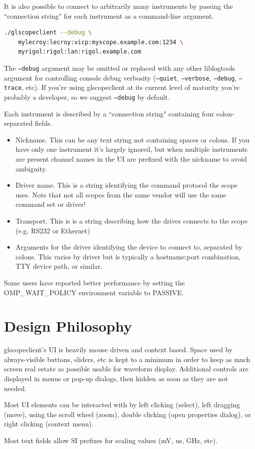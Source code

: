 It is also possible to connect to arbitrarily many instruments by passing the ``connection string" for each instrument
as a command-line argument.

\begin{lstlisting}[language=sh]
./glscopeclient --debug \
	mylecroy:lecroy:vicp:myscope.example.com:1234 \
	myrigol:rigol:lan:rigol.example.com
\end{lstlisting}

The \texttt{--debug} argument may be omitted or replaced with any other liblogtools argument for controlling console
debug verbosity (\texttt{--quiet}, \texttt{--verbose}, \texttt{--debug}, \texttt{--trace}, etc). If you're using
glscopeclient at its current level of maturity you're probably a developer, so we suggest \texttt{--debug} by default.

Each instrument is described by a ``connection string" containing four colon-separated fields.

\begin{itemize}
\item Nickname. This can be any text string not containing spaces or colons. If you have only one instrument it's
largely ignored, but when multiple instruments are present channel names in the UI are prefixed with the nickname to
avoid ambiguity.
\item Driver name. This is a string identifying the command protocol the scope uses. Note that not all
scopes from the same vendor will use the same command set or driver!
\item Transport. This is is a string describing how the driver connects to the scope (e.g. RS232 or Ethernet)
\item Arguments for the driver identifying the device to connect to, separated by colons. This varies by driver but is
typically a hostname:port combination, TTY device path, or similar.
\end{itemize}

Some users have reported better performance by setting the OMP\_WAIT\_POLICY environment variable to PASSIVE.

\section{Design Philosophy}

glscopeclient's UI is heavily mouse driven and context based. Space used by always-visible buttons, sliders, etc is
kept to a minimum in order to keep as much screen real estate as possible usable for waveform display. Additional
controls are displayed in menus or pop-up dialogs, then hidden as soon as they are not needed.

Most UI elements can be interacted with by left clicking (select), left dragging (move), using the scroll wheel (zoom),
double clicking (open properties dialog), or right clicking (context menu).

Most text fields allow SI prefixes for scaling values (mV, us, GHz, etc).
